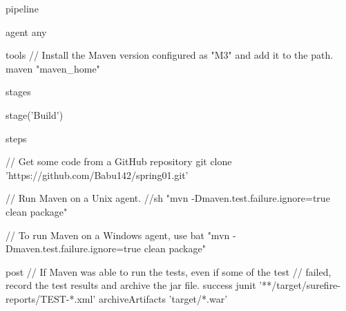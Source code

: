 pipeline {
    agent any

    tools {
        // Install the Maven version configured as "M3" and add it to the path.
        maven "maven_home"
    }

    stages {
        stage('Build') {
            steps {
                // Get some code from a GitHub repository
                git clone 'https://github.com/Babu142/spring01.git'

                // Run Maven on a Unix agent.
                //sh "mvn -Dmaven.test.failure.ignore=true clean package"

                // To run Maven on a Windows agent, use
                 bat "mvn -Dmaven.test.failure.ignore=true clean package"
            }

            post {
                // If Maven was able to run the tests, even if some of the test
                // failed, record the test results and archive the jar file.
                success {
                    junit '**/target/surefire-reports/TEST-*.xml'
                    archiveArtifacts 'target/*.war'
                }
            }
        }
    }
}
